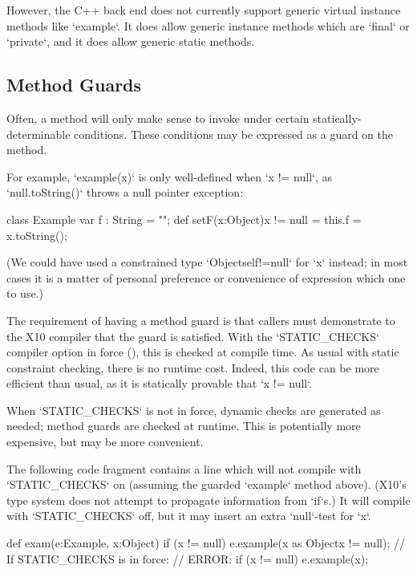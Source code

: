 However, the C++ back end does not currently support generic virtual instance
methods like \xcd`example`.  It does allow generic instance methods which are
\xcd`final` or \xcd`private`, and it does allow generic static methods.  


\subsection{Method Guards}
\label{MethodGuard}

Often, a method will only make sense to invoke under certain
statically-determinable conditions.  These conditions may be expressed as a
guard on the method.

\begin{ex}
For example, \xcd`example(x)` is only
well-defined when \xcd`x != null`, as \xcd`null.toString()` throws a null
pointer exception: 
% 
\begin{xten}
class Example {
   var f : String = "";
   def setF(x:Object){x != null} = {
      this.f = x.toString();
   }
}
\end{xten}
%
\noindent
(We could have used a constrained type \xcd`Object{self!=null}` for \xcd`x`
instead; in
most cases it is a matter of personal preference or convenience of expression
which one to use.) 
\end{ex}


The requirement of having a method guard 
is that callers must demonstrate to
the X10
compiler that the guard is satisfied.  
With the \xcd`STATIC_CHECKS` compiler option in force (), this is
checked at compile time. 
As usual with static constraint
checking, there is no runtime cost.  Indeed, this code can be more efficient
than usual, as it is statically provable that \xcd`x != null`.

When \xcd`STATIC_CHECKS` is not in force, dynamic checks are generated as
needed; method guards are checked at runtime. This is potentially more
expensive, but may be more convenient. 

\begin{ex}
The following code fragment contains a line which will not compile 
with \xcd`STATIC_CHECKS` on (assuming the guarded \xcd`example` method above).  (X10's type system does not attempt to propagate 
information from \xcd`if`s.)  It will compile with \xcd`STATIC_CHECKS` off,
but it may insert an extra \xcd`null`-test for \xcd`x`.  
\begin{xten}
  def exam(e:Example, x:Object) {
    if (x != null) 
       e.example(x as Object{x != null});
       // If STATIC_CHECKS is in force: 
       // ERROR: if (x != null) e.example(x); 
  }
\end{xten}
\end{ex}


